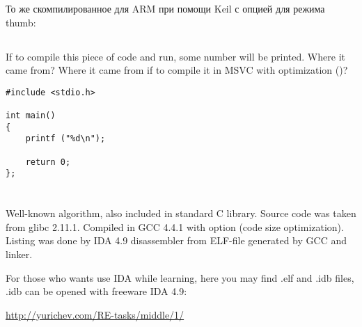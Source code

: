 

То же скомпилированное для ARM при помощи Keil с опцией \Othree для режима thumb:



\subsection{}

{If to compile this piece of code and run, some number will be printed. Where it came from?
Where it came from if to compile it in MSVC with optimization (\Ox)?}

\begin{lstlisting}
#include <stdio.h>

int main()
{
	printf ("%d\n");

	return 0;
};
\end{lstlisting}

\section{}

\subsection{}

{Well-known algorithm, also included in standard C library. Source code was taken from glibc 2.11.1.
Compiled in GCC 4.4.1 with  option (code size optimization).
Listing was done by IDA 4.9 disassembler from ELF-file generated by GCC and linker.}

{For those who wants use IDA while learning, here you may find .elf and .idb files,
.idb can be opened with freeware IDA 4.9:}

\url{http://yurichev.com/RE-tasks/middle/1/}

